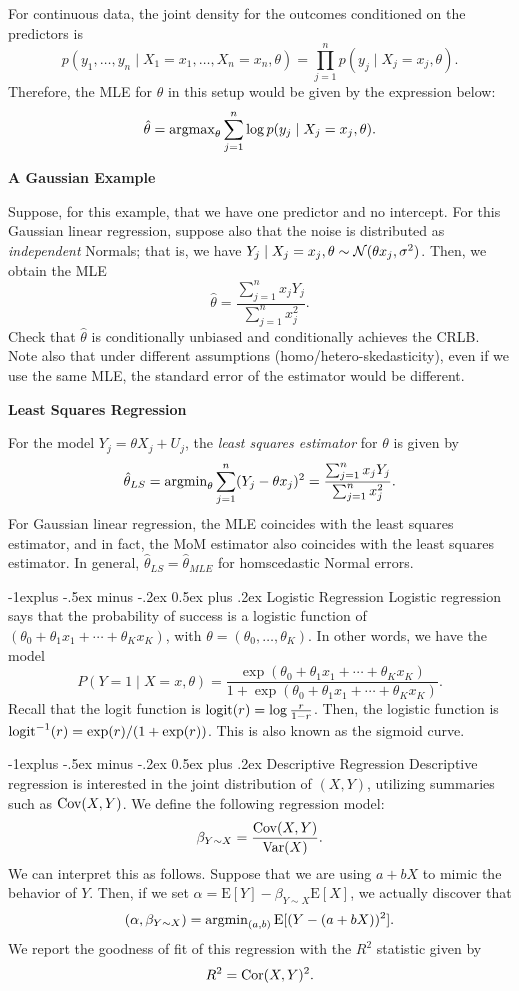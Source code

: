 \documentclass[10pt,landscape]{article}
\makeatletter
\renewcommand{\subsection}{\@startsection{subsection}{2}{0mm}%
                                {-1explus -.5ex minus -.2ex}%
                                {0.5ex plus .2ex}%
                                {\normalfont\normalsize\bfseries}}
\newcommand{\E}{\text{E}}
\makeatother
\begin{document}
\begin{multicols*}{3}
For continuous data, the joint density for the outcomes conditioned on the predictors is $$p(y_1,\dots,y_n\mid X_1=x_1,\dots,X_n=x_n,\theta)=\prod_{j=1}^n p(y_j\mid X_j=x_j,\theta).$$ Therefore, the MLE for $\theta$ in this setup would be given by the expression below: $$\hat{\theta}=\operatorname{argmax}_\theta \sum_{j=1}^n \log p(y_j\mid X_j=x_j,\theta).$$

\textbf{A Gaussian Example}

Suppose, for this example, that we have one predictor and no intercept. For this Gaussian linear regression, suppose also that the noise is distributed as \emph{independent} Normals; that is, we have $Y_j\mid X_j=x_j,\theta \sim \mathcal{N}(\theta x_j,\sigma^2)$. Then, we obtain the MLE $$\hat{\theta}=\frac{\sum_{j=1}^n x_jY_j}{\sum_{j=1}^n x_j^2}.$$ Check that $\hat{\theta}$ is conditionally unbiased and conditionally achieves the CRLB. Note also that under different assumptions (homo/hetero-skedasticity), even if we use the same MLE, the standard error of the estimator would be different.

\textbf{Least Squares Regression}

For the model $Y_j=\theta X_j+U_j$, the \emph{least squares estimator} for $\theta$ is given by $$\hat{\theta}_{LS}=\operatorname{argmin}_\theta \sum_{j=1}^n (Y_j-\theta x_j)^2=\frac{\sum_{j=1}^n x_jY_j}{\sum_{j=1}^n x_j^2}.$$ For Gaussian linear regression, the MLE coincides with the least squares estimator, and in fact, the MoM estimator also coincides with the least squares estimator. In general, $\hat\theta_{LS}=\hat\theta_{MLE}$ for homscedastic Normal errors.

\subsection{Logistic Regression}
Logistic regression says that the probability of success
is a logistic function of $(\theta_0 + \theta_1 x_1 +\cdots + \theta_K x_K)$, with $\theta= (\theta_0, \dots, \theta_K)$. In other words, we have the model $$P(Y=1\mid X=x,\theta)=\frac{\exp(\theta_0 + \theta_1 x_1 +\cdots + \theta_K x_K)}{1+\exp(\theta_0 + \theta_1 x_1 +\cdots + \theta_K x_K)}.$$ Recall that the logit function is $\operatorname{logit}(r)=\log \frac{r}{1-r}$. Then, the logistic function is $\operatorname{logit}^{-1}(r)= \exp(r)/(1+\exp(r))$. This is also known as the sigmoid curve.

\subsection{Descriptive Regression}
Descriptive regression is interested
in the joint distribution of $(X,Y)$, utilizing summaries such as $\operatorname{Cov}(X, Y)$. We define the following regression model: $$\beta_{Y\sim X} =\frac{\operatorname{Cov}(X,Y)}{\operatorname{Var}( X)}.$$ We can interpret this as follows. Suppose that we are using $a + bX$ to mimic the behavior of $Y$. Then, if we set $\alpha = \E [Y] -\beta_{Y\sim X} \E [X]$, we actually discover that $$(\alpha,\beta_{Y\sim X})=\argmin_{(a,b)}\E [(Y-(a+bX))^2].$$ We report the goodness of fit of this regression with the $R^2$ statistic given by $$R^2=\operatorname{Cor}(X,Y)^2.$$


\end{multicols*}
\end{document}
